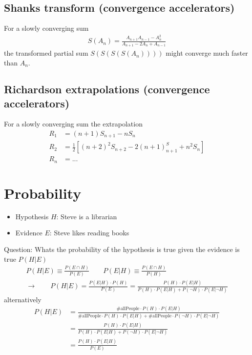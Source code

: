 \documentclass[../main.tex]{subfiles}
\begin{document}
\subsection{Shanks transform (convergence accelerators)}
For a slowly converging sum
\begin{align}
S(A_n)=\frac{A_{n+1}A_{n-1}-A_n^2}{A_{n+1}-2A_n+A_{n-1}}
\end{align}
the transformed partial sum $S(S(S(S(A_n))))$ might converge much faster than $A_n$.
\subsection{Richardson extrapolations (convergence accelerators)}
For a slowly converging sum the extrapolation
\begin{align}
R_1&=(n+1)S_{n+1}-nS_n\\
R_2&=\frac{1}{2}\left[(n+2)^2S_{n+2}-2(n+1)^S_{n+1}+n^2S_n\right]\\
R_n&=...
\end{align}

\newpage
\section{Probability}

\begin{itemize}
\item Hypothesis $H$: Steve is a librarian
\item Evidence $E$: Steve likes reading books
\end{itemize}
Question: Whats the probability of the hypothesis is true given the evidence is true $P(H|E)$ 
\begin{align}
   P(H|E)\equiv\frac{P(E\cap H)}{P(E)}\qquad P(E|H)\equiv\frac{P(E\cap H)}{P(H)}\\
   \rightarrow\qquad P(H|E)=\frac{P(E|H)\cdot P(H)}{P(E)}=\frac{P(H)\cdot P(E|H)}{P(H)\cdot P(E|H)+ P(\neg H)\cdot P(E|\neg H)}
\end{align}
alternatively
\begin{align}
  P(H|E)&=\frac{\#\text{allPeople}\cdot P(H)\cdot P(E|H)}{\#\text{allPeople}\cdot P(H)\cdot P(E|H)+\#\text{allPeople}\cdot P(\neg H)\cdot P(E|\neg H)}\\
  &=\frac{P(H)\cdot P(E|H)}{P(H)\cdot P(E|H)+ P(\neg H)\cdot P(E|\neg H)}\\
  &=\frac{P(H)\cdot P(E|H)}{P(E)}
\end{align}
\end{document}

